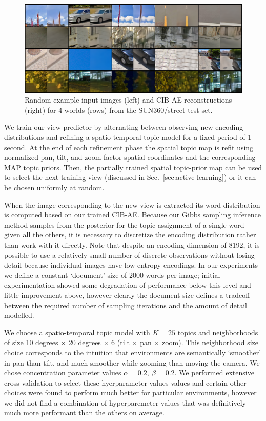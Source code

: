 \begin{figure}
    \centering
    \includegraphics[width=\textwidth]{figures/ptz/mc3ae_encodings}
    \caption{Random example input images (left) and CIB-AE reconstructions (right) for 4 worlds (rows) from the SUN360/street test set.}
    \label{fig:cibae_encodings}
\end{figure}

We train our view-predictor by alternating between observing new encoding distributions and refining a spatio-temporal topic model for a fixed period of 1 second. At the end of each refinement phase the spatial topic map is refit using normalized pan, tilt, and zoom-factor spatial coordinates and the corresponding MAP topic priors. Then, the partially trained spatial topic-prior map can be used to select the next training view (discussed in Sec.~\ref{sec:active-learning}) or it can be chosen uniformly at random.

When the image corresponding to the new view is extracted its word distribution is computed based on our trained CIB-AE. Because our Gibbs sampling inference method samples from the posterior for the topic assignment of a single word given all the others, it is necessary to discretize the encoding distribution rather than work with it directly. Note that despite an encoding dimension of 8192, it is possible to use a relatively small number of discrete observations without losing detail because individual images have low entropy encodings. In our experiments we define a constant `document' size of 2000 words per image; initial experimentation showed some degradation of performance below this level and little improvement above, however clearly the document size defines a tradeoff between the required number of sampling iterations and the amount of detail modelled.

We choose a spatio-temporal topic model with $K = 25$ topics and neighborhoods of size 10 degrees $\times$ 20 degrees $\times$ 6 (tilt $\times$ pan $\times$ zoom). This neighborhood size choice corresponds to the intuition that environments are semantically `smoother' in pan than tilt, and much smoother while zooming than moving the camera. We chose concentration parameter values $\alpha = 0.2,~\beta = 0.2$. We performed extensive cross validation to select these hyerparameter values values and certain other choices were found to perform much better for particular environments, however we did not find a combination of hyperparemeter values that was definitively much more performant than the others on average.

